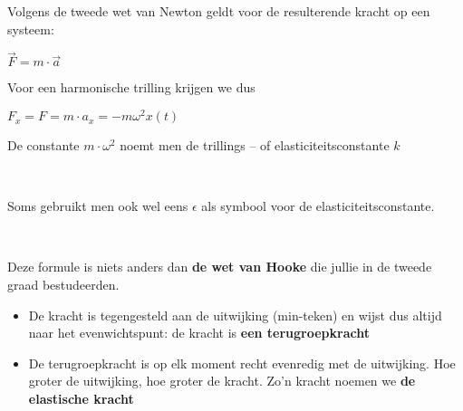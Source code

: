 \documentclass{ximera}
\begin{document}
    \author{Ingmar Herreman}
    \date{Februari 2024}



Volgens de tweede wet van Newton geldt voor de resulterende kracht op een systeem:
\begin{center}
    $\vec{F}=m\cdot \vec{a}$
\end{center}

Voor een harmonische trilling krijgen we dus
\begin{center}
    $F_x=F=m\cdot a_x=-m\omega^2 x(t)$
\end{center}

De constante $m\cdot \omega^2$ noemt men de trillings – of elasticiteitsconstante $k$

\begin{definition}
    [De elasticiteitsconstante] \ \\
    \begin{center}
    \end{center}
    
\end{definition}
\begin{remark}
 Soms gebruikt men ook wel eens $\epsilon$ als symbool voor de elasticiteitsconstante.
\end{remark}

\begin{definition}
     \ \\
    \begin{center}
    \end{center}
\end{definition}

\begin{remark}
    Deze formule is niets anders dan \textbf{de wet van Hooke} die jullie in de tweede graad bestudeerden.
\end{remark}

\begin{itemize}
    \item De kracht is tegengesteld aan de uitwijking (min-teken) en wijst dus altijd naar het evenwichtspunt: de kracht is \textbf{een terugroepkracht}
    \item De terugroepkracht is op elk moment recht evenredig met de uitwijking. Hoe groter de uitwijking, hoe groter de kracht. Zo’n kracht noemen we \textbf{de elastische kracht}

\end{itemize}
\end{document}

